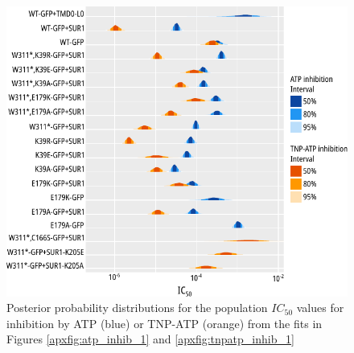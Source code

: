 \begin{figure}[h]
	\centering
	\includegraphics[width=\textwidth]{all_inhibition_params.pdf}
	\caption[Nucleotide inhibition IC\textsubscript{50} posterior distributions]{
	Posterior probability distributions for the population $IC_{50}$ values for inhibition by ATP (blue) or TNP-ATP (orange) from the fits in Figures \ref{apxfig:atp_inhib_1} and \ref{apxfig:tnpatp_inhib_1}
	}
	\label{apxfig:inhib_params}
\end{figure}

